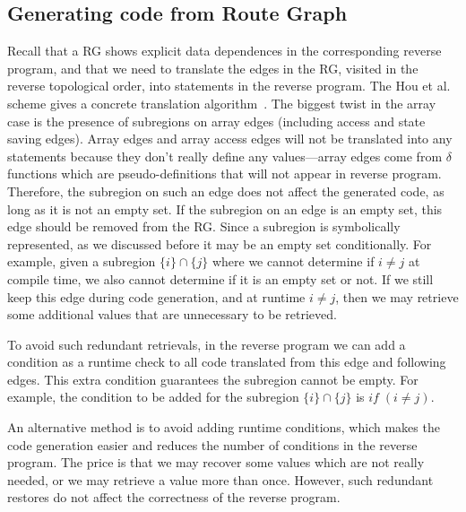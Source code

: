 



\subsection{Generating code from Route Graph}
Recall that a RG shows explicit data dependences in the corresponding reverse program, and that we need to translate the edges in the RG, visited in the reverse topological order, into statements in the reverse program.
The Hou et al. scheme gives a concrete translation algorithm~\cite{Hou2012}.
The biggest twist in the array case is the presence of subregions on array edges (including access and state saving edges).
Array edges and array access edges will not be translated into any statements because they don't really define any values---array edges come from $\delta$ functions which are pseudo-definitions that will not appear in reverse program.
Therefore, the subregion on such an edge does not affect the generated code, as long as it is not an empty set.
If the subregion on an edge is an empty set, this edge should be removed from the RG.
Since a subregion is symbolically represented, as we discussed before it may be an empty set conditionally.
For example, given a subregion $\{i\}\cap\{j\}$ where we cannot determine if $i\ne j$ at compile time, we also cannot determine if it is an empty set or not.
If we still keep this edge during code generation, and at runtime $i\ne j$, then we may retrieve some additional values that are unnecessary to be retrieved.

To avoid such redundant retrievals, in the reverse program we can add a condition as a runtime check to all code translated from this edge and following edges. 
This extra condition guarantees the subregion cannot be empty.
For example, the condition to be added for the subregion $\{i\}\cap\{j\}$ is $if\;(i\ne j)$.

An alternative method is to avoid adding runtime conditions, which makes the code generation easier and reduces the number of conditions in the reverse program.
The price is that we may recover some values which are not really needed, or we may retrieve a value more than once.
However, such redundant restores do not affect the correctness of the reverse program.


